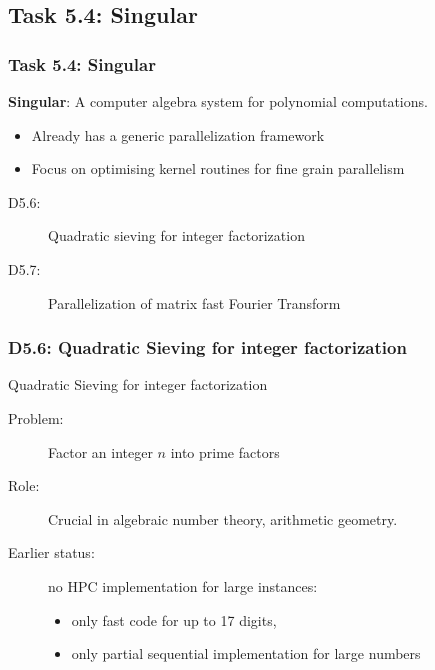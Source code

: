 \documentclass{beamer}
\begin{document}
\subsection{Task 5.4: Singular}
\begin{frame}
  \frametitle{Task 5.4: Singular}
\begin{center}{\Large
    \textbf{Singular}: A computer algebra system for polynomial computations.}
\end{center}

  \begin{itemize}
  \item Already has a generic parallelization framework
  \item Focus on optimising  kernel routines for fine grain parallelism
  \end{itemize}

  \begin{description}
  \item[D5.6:] Quadratic sieving for integer factorization
  \item[D5.7:] Parallelization of matrix fast Fourier Transform
  \end{description}
\end{frame}
\begin{frame}
  \frametitle{D5.6: Quadratic Sieving for integer factorization}

  \begin{block}{Quadratic Sieving for integer factorization}
    \begin{description}
    \item[Problem:]  Factor an integer $n$ into prime factors
    \item[Role:] Crucial in algebraic number theory, arithmetic geometry.
    \item [Earlier status:] no HPC implementation for large instances:
      \begin{itemize}
      \item only fast code for up to 17 digits,
      \item only partial sequential implementation for large numbers
      \end{itemize}
    \end{description}
    \end{block}
\end{frame}
\end{document}
